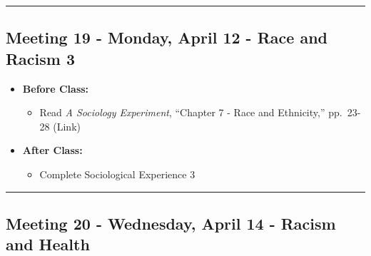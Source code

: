 \documentclass[
]{book}
\providecommand{\tightlist}{%
  \setlength{\itemsep}{0pt}\setlength{\parskip}{0pt}}
\begin{document}
\begin{center}\rule{0.5\linewidth}{0.5pt}\end{center}

\hypertarget{meeting-19---monday-april-12---race-and-racism-3}{%
\subsection*{Meeting 19 - Monday, April 12 - Race and Racism 3}\label{meeting-19---monday-april-12---race-and-racism-3}}

\begin{itemize}
\tightlist
\item
  \textbf{Before Class:}

  \begin{itemize}
  \tightlist
  \item
    Read \emph{A Sociology Experiment}, ``Chapter 7 - Race and Ethnicity,'' pp.~23-28 (Link)
  \end{itemize}
\item
  \textbf{After Class:}

  \begin{itemize}
  \tightlist
  \item
    Complete Sociological Experience 3
  \end{itemize}
\end{itemize}

\begin{center}\rule{0.5\linewidth}{0.5pt}\end{center}

\hypertarget{meeting-20---wednesday-april-14---racism-and-health}{%
\subsection*{Meeting 20 - Wednesday, April 14 - Racism and Health}\label{meeting-20---wednesday-april-14---racism-and-health}}
\end{document}
